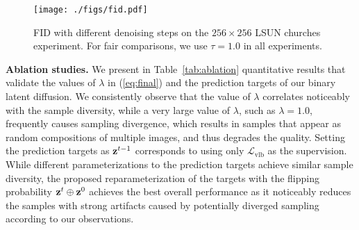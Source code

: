 \documentclass[10pt,twocolumn,letterpaper]{article}
\begin{document}
\begin{table}[]
    \caption{Comparisons on image generation speed with seconds per sample (s/sample). All results are obtained by averaging 1,000 times sampling with a batch size of 1. 64s and 16s denote 64 and 16 denoising steps, respectively. }
    \label{tab:speed}
    \centering
    \small
\end{table}


\begin{figure}[]
    \centering
	\texttt{[image: ./figs/fid.pdf]}
\caption{FID with different denoising steps on the $256 \times 256$ LSUN churches experiment. For fair comparisons, we use $\tau = 1.0$ in all experiments. }
\label{fig:fid}
\vspace{-2mm}
\end{figure}

\noindent \textbf{Ablation studies.}
We present in Table~\ref{tab:ablation} quantitative results that validate the values of $\lambda$ in (\ref{eq:final}) and the prediction targets of our binary latent diffusion. We consistently observe that the value of $\lambda$ correlates noticeably with the sample diversity, while a very large value of $\lambda$, such as $\lambda = 1.0$, frequently causes sampling divergence, which results in samples that appear as random compositions of multiple images, and thus degrades the quality. 
Setting the prediction targets as $\textbf{z}^{t-1}$ corresponds to using only $\mathcal{L}_\text{vlb}$ as the supervision. While different parameterizations to the prediction targets achieve similar sample diversity, the proposed reparameterization of the targets with the flipping probability $\textbf{z}^t \oplus \textbf{z}^0$ achieves the best overall performance as it noticeably reduces the samples with strong artifacts caused by potentially diverged sampling according to our observations. 
\end{document}
